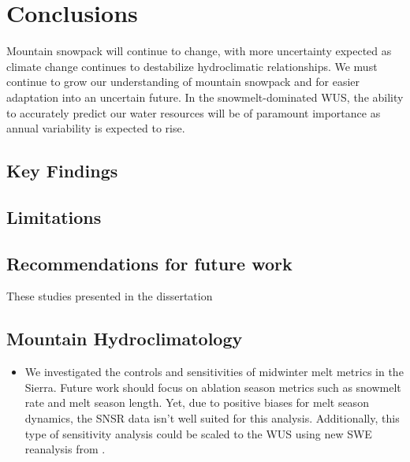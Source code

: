 
\hypertarget{ch5}{\chapter{Conclusions}\label{ch5}}

Mountain snowpack will continue to change, with more uncertainty expected as climate change continues to destabilize hydroclimatic relationships. We must continue to grow our understanding of mountain snowpack and for easier adaptation into an uncertain future. In the snowmelt-dominated WUS, the ability to accurately predict our water resources will be of paramount importance as annual variability is expected to rise.

\hypertarget{ch1-intro-1}{\section{Key Findings}\label{ch1-intro-1}}



\hypertarget{ch1-intro-1}{\section{Limitations}\label{ch1-intro-1}}

\hypertarget{ch1-intro-1}{\section{Recommendations for future work}\label{ch1-intro-1}}
These studies presented in the dissertation 


\hypertarget{ch1-intro-2}{\section{Mountain Hydroclimatology}\label{ch1-intro-1}}
\begin{enumerate}
   \begin{itemize}
     \item We investigated the controls and sensitivities of midwinter melt metrics in the Sierra. Future work should focus on ablation season metrics such as snowmelt rate and melt season length. Yet, due to positive biases for melt season dynamics, the SNSR data isn't well suited for this analysis. Additionally, this type of sensitivity analysis could be scaled to the WUS using new SWE reanalysis from \citep{fangWesternUnitedStates2022}.
   \end{itemize}
\end{enumerate}

